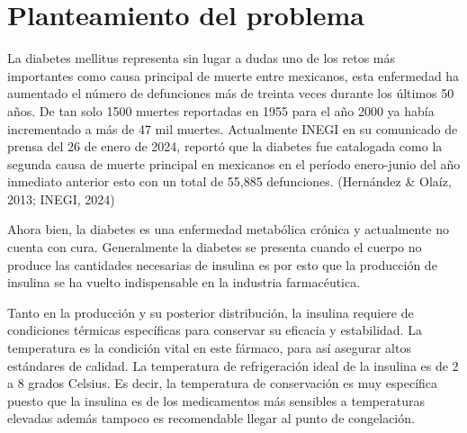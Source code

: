 
%

	\pagenumbering{roman}

\tableofcontents
\listoftables
\listoffigures













\newpage


\section*{Planteamiento del problema}

La diabetes mellitus representa sin lugar a dudas uno de los retos más importantes como causa principal de muerte entre mexicanos, esta enfermedad ha aumentado el número de defunciones más de treinta veces durante los últimos 50 años. De tan solo 1500 muertes reportadas en 1955 para el año 2000 ya había incrementado a más de 47 mil muertes. Actualmente INEGI en su comunicado de prensa del 26 de enero de 2024, reportó que la diabetes fue catalogada como la segunda causa de muerte principal en mexicanos en el período enero-junio del año inmediato anterior esto con un total de 55,885 defunciones. (Hernández \& Olaíz, 2013; INEGI, 2024) 

Ahora bien, la diabetes es una enfermedad metabólica crónica y actualmente no cuenta con cura. Generalmente la diabetes se presenta cuando el cuerpo no produce las cantidades necesarias de insulina es por esto que la producción de insulina se ha vuelto indispensable en la industria farmacéutica.

Tanto en la producción y su posterior distribución, la insulina requiere de condiciones térmicas específicas para conservar su eficacia y estabilidad. La temperatura es la condición vital en este fármaco, para así asegurar altos estándares de calidad. La temperatura de refrigeración ideal de la insulina es de 2 a 8 grados Celsius. Es decir, la temperatura de conservación es muy específica puesto que la insulina es de los medicamentos más sensibles a temperaturas elevadas además tampoco es recomendable llegar al punto de congelación.

